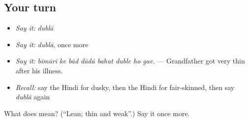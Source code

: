 \subsection*{Your turn}
\begin{itemize}
\raggedright
  \item \emph{Say it:} \emph{dublā}
  \item \emph{Say it:} \emph{dublā}, once more
  \item \emph{Say it:} \emph{bīmārī ke bād dādā bahut duble ho gae.} — Grandfather got very thin after his illness.
  \item \emph{Recall:} say the Hindi for dusky, then the Hindi for fair-skinned, then say \emph{dublā} again
\end{itemize}

\begin{tcolorbox}[breakable,colback=teal!4,colframe=teal!35!black,title={Before you move on}]
What does  mean? (\textquotedblleft{}Lean; thin and weak\textquotedblright{}.) Say it once more.
\end{tcolorbox}
